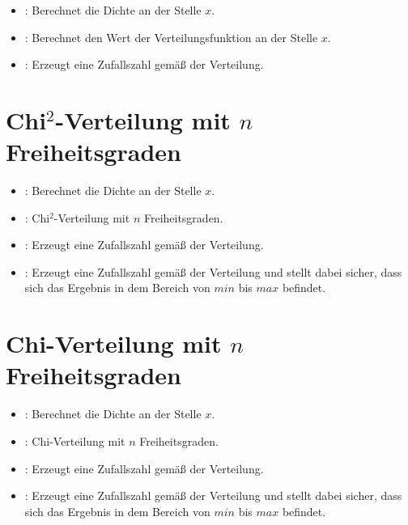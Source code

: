 \begin{itemize}

\item
{}:
Berechnet die Dichte an der Stelle $x$.

\item
{}:
Berechnet den Wert der Verteilungsfunktion an der Stelle $x$.

\item
{}:
Erzeugt eine Zufallszahl gemäß der Verteilung.

\end{itemize}



\section{\texorpdfstring{Chi$^2$}{Chi2}-Verteilung mit \texorpdfstring{$n$}{n} Freiheitsgraden}

\begin{itemize}

\item
{}:
Berechnet die Dichte an der Stelle $x$.

\item
{}:
Chi$^2$-Verteilung mit $n$ Freiheitsgraden.

\item
{}:
Erzeugt eine Zufallszahl gemäß der Verteilung.

\item
{}:
Erzeugt eine Zufallszahl gemäß der Verteilung und stellt dabei sicher, dass sich das Ergebnis in dem Bereich von $min$ bis $max$ befindet.

\end{itemize}



\section{Chi-Verteilung mit \texorpdfstring{$n$}{n} Freiheitsgraden}

\begin{itemize}

\item
{}:
Berechnet die Dichte an der Stelle $x$.

\item
{}:
Chi-Verteilung mit $n$ Freiheitsgraden.

\item
{}:
Erzeugt eine Zufallszahl gemäß der Verteilung.

\item
{}:
Erzeugt eine Zufallszahl gemäß der Verteilung und stellt dabei sicher, dass sich das Ergebnis in dem Bereich von $min$ bis $max$ befindet.

\end{itemize}




